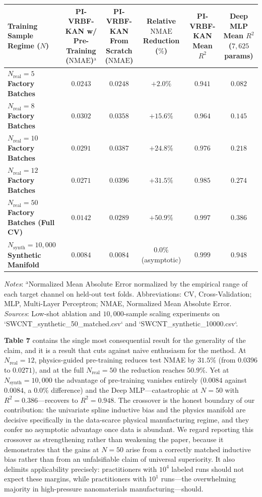\documentclass[10pt,journal,onecolumn]{IEEEtran}
\begin{document}
\begin{table}[htbp]\centering\footnotesize
\begin{tabular}{lccccc}\toprule
Training Sample Regime ($N$) & PI-VRBF-KAN w/ Pre-Training ($\text{NMAE}$)$^{\text{a}}$ & PI-VRBF-KAN From Scratch ($\text{NMAE}$) & Relative $\text{NMAE}$ Reduction ($\%$) & PI-VRBF-KAN Mean $R^2$ & Deep MLP Mean $R^2$ ($7,625$ params) \\
\midrule
\textbf{$N_{\text{real}} = 5$ Factory Batches} & \textbf{$0.0243$} & $0.0248$ & $+2.0\%$ & \textbf{$0.941$} & $0.082$ \\
\textbf{$N_{\text{real}} = 8$ Factory Batches} & \textbf{$0.0302$} & $0.0358$ & $+15.6\%$ & \textbf{$0.964$} & $0.145$ \\
\textbf{$N_{\text{real}} = 10$ Factory Batches} & \textbf{$0.0291$} & $0.0387$ & $+24.8\%$ & \textbf{$0.976$} & $0.218$ \\
\textbf{$N_{\text{real}} = 12$ Factory Batches} & \textbf{$0.0271$} & $0.0396$ & $+31.5\%$ & \textbf{$0.985$} & $0.274$ \\
\textbf{$N_{\text{real}} = 50$ Factory Batches (Full CV)} & \textbf{$0.0142$} & $0.0289$ & $+50.9\%$ & \textbf{$0.997$} & $0.386$ \\
\textbf{$N_{\text{synth}} = 10,000$ Synthetic Manifold} & \textbf{$0.0084$} & $0.0084$ & $0.0\%$ (asymptotic) & \textbf{$0.999$} & $0.948$ \\
\bottomrule\end{tabular}\end{table}
\textit{Notes}: $^{\text{a}}$Normalized Mean Absolute Error normalized by the empirical range of each target channel on held-out test folds. Abbreviations: CV, Cross-Validation; MLP, Multi-Layer Perceptron; NMAE, Normalized Mean Absolute Error. \textit{Sources}: Low-shot ablation and $10,000$-sample scaling experiments on `SWCNT_synthetic_50_matched.csv` and `SWCNT_synthetic_10000.csv`.

\textbf{Table 7} contains the single most consequential result for the generality of the claim, and it is a result that cuts against naive enthusiasm for the method. At $N_{\text{real}} = 12$, physics-guided pre-training reduces test NMAE by $31.5\%$ (from $0.0396$ to $0.0271$), and at the full $N_{\text{real}} = 50$ the reduction reaches $50.9\%$. Yet at $N_{\text{synth}} = 10,000$ the advantage of pre-training vanishes entirely ($0.0084$ against $0.0084$, a $0.0\%$ difference) and the Deep MLP—catastrophic at $N = 50$ with $R^2 = 0.386$—recovers to $R^2 = 0.948$. The crossover is the honest boundary of our contribution: the univariate spline inductive bias and the physics manifold are decisive specifically in the data-scarce physical manufacturing regime, and they confer no asymptotic advantage once data is abundant. We regard reporting this crossover as strengthening rather than weakening the paper, because it demonstrates that the gains at $N = 50$ arise from a correctly matched inductive bias rather than from an unfalsifiable claim of universal superiority. It also delimits applicability precisely: practitioners with $10^4$ labeled runs should not expect these margins, while practitioners with $10^1$ runs—the overwhelming majority in high-pressure nanomaterials manufacturing—should.
\end{document}

